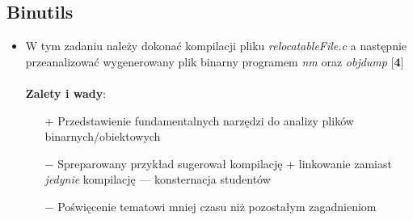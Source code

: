 \documentclass[12pt]{article}
\begin{document}
\subsection{Binutils}
\begin{itemize}
\item W tym zadaniu należy dokonać kompilacji pliku \textit{relocatableFile.c} a
  następnie przeanalizować wygenerowany plik binarny programem \textit{nm} oraz
  \textit{objdump} [\textbf{4}]\\ \\
  \textbf{Zalety i wady}:
  \begin{itemize}
  \item[$+$] Przedstawienie fundamentalnych narzędzi do analizy plików
    binarnych/obiektowych
  \item[$-$] Spreparowany przykład sugerował kompilację + linkowanie zamiast
    \textit{jedynie} kompilację --- konsternacja studentów
  \item[$-$] Poświęcenie tematowi mniej czasu niż pozostałym zagadnieniom
  \end{itemize}

\end{itemize}
\end{document}

